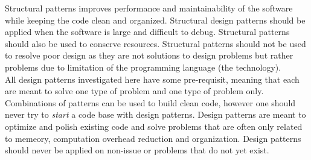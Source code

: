 Structural patterns improves performance and maintainability of the software while keeping the code clean and organized. Structural design patterns should be applied when the software is large and difficult to debug. Structural patterns should also be used to conserve resources. Structural patterns should not be used to resolve poor design as they are not solutions to design problems but rather problems due to limitation of the programming language (the technology).
\bs
\\
All design patterns investigated here have some pre-requisit, meaning that each are meant to solve one type of problem and one type of problem only. Combinations of patterns can be used to build clean code, however one should never try to \textit{start} a code base with design patterns. Design patterns are meant to optimize and polish existing code and solve problems that are often only related to memeory, computation overhead reduction and organization. Design patterns should never be applied on non-issue or problems that do not yet exist.